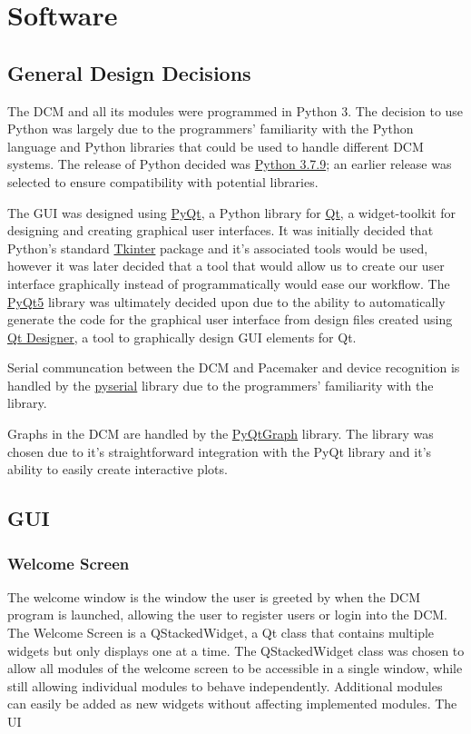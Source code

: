 \documentclass[12pt]{article}
\begin{document}
\newpage
\section{Software}
\subsection{General Design Decisions}
The DCM and all its modules were programmed in Python 3. The decision to use Python was largely due to the programmers' familiarity with the Python language and Python libraries that could be used to handle different DCM systems. The release of Python decided was \href{https://www.python.org/downloads/release/python-379/}{Python 3.7.9}; an earlier release was selected to ensure compatibility with potential libraries.

The GUI was designed using \href{https://riverbankcomputing.com/software/pyqt/intro}{PyQt}, a Python library for \href{https://www.qt.io/}{Qt}, a widget-toolkit for designing and creating graphical user interfaces. It was initially decided that Python's standard \href{https://docs.python.org/3/library/tkinter.html}{Tkinter} package and it's associated tools would be used, however it was later decided that a tool that would allow us to create our user interface graphically instead of programmatically would ease our workflow. The \href{https://pypi.org/project/PyQt5/}{PyQt5} library was ultimately decided upon due to the ability to automatically generate the code for the graphical user interface from design files created using \href{https://doc.qt.io/qt-5/qtdesigner-manual.html}{Qt Designer}, a tool to graphically design GUI elements for Qt.

Serial communcation between the DCM and Pacemaker and device recognition is handled by the \href{https://pypi.org/project/pyserial/}{pyserial} library due to the programmers' familiarity with the library.

Graphs in the DCM are handled by the \href{http://www.pyqtgraph.org/}{PyQtGraph} library. The library was chosen due to it's straightforward integration with the PyQt library and it's ability to easily create interactive plots.

\subsection{GUI}
\subsubsection{Welcome Screen}
The welcome window is the window the user is greeted by when the DCM program is launched, allowing the user to register users or login into the DCM. The Welcome Screen is a QStackedWidget, a Qt class that contains multiple widgets but only displays one at a time. The QStackedWidget class was chosen to allow all modules of the welcome screen to be accessible in a single window, while still allowing individual modules to behave independently. Additional modules can easily be added as new widgets without affecting implemented modules. The UI
\end{document}
